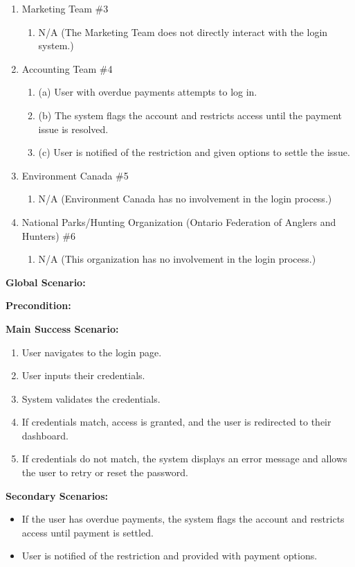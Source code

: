 \documentclass[]{article}
\begin{document}
\begin{enumerate}[{\bf BE1.}]
\begin{enumerate}[{\bf VP1.}]
\item Marketing Team \#3 \
\begin{enumerate}
\item N/A (The Marketing Team does not directly interact with the login system.)
\end{enumerate}
 
\item Accounting Team \#4 \
\begin{enumerate}
\item (a) User with overdue payments attempts to log in.
\item (b) The system flags the account and restricts access until the payment issue is resolved.
\item (c) User is notified of the restriction and given options to settle the issue.
\end{enumerate}
 
\item Environment Canada \#5 
\begin{enumerate}
\item N/A (Environment Canada has no involvement in the login process.)
\end{enumerate}
 
\item National Parks/Hunting Organization (Ontario Federation of Anglers and Hunters) \#6 \
\begin{enumerate}
\item N/A (This organization has no involvement in the login process.)
\end{enumerate}
\end{enumerate}
 
\textbf{Global Scenario:}
 
\textbf{Precondition:}
 
\textbf{Main Success Scenario:}
\begin{enumerate}
\item User navigates to the login page.
\item User inputs their credentials.
\item System validates the credentials.
\item If credentials match, access is granted, and the user is redirected to their dashboard.
\item If credentials do not match, the system displays an error message and allows the user to retry or reset the password.
\end{enumerate}
 
\textbf{Secondary Scenarios:}
\begin{itemize}
\item If the user has overdue payments, the system flags the account and restricts access until payment is settled.
\item User is notified of the restriction and provided with payment options.
\end{itemize}


\end{enumerate}
\end{document}
